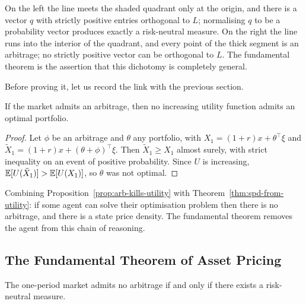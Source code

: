 \documentclass[a4paper]{scrartcl}
\begin{document}
On the left the line meets the shaded quadrant only at the origin, and there is a vector $q$ with strictly positive entries orthogonal to $L$; normalising $q$ to be a probability vector produces exactly a risk-neutral measure. On the right the line runs into the interior of the quadrant, and every point of the thick segment is an arbitrage; no strictly positive vector can be orthogonal to $L$. The fundamental theorem is the assertion that this dichotomy is completely general.

Before proving it, let us record the link with the previous section.

\begin{proposition}\label{prop:arb-kills-utility}
	If the market admits an arbitrage, then no increasing utility function admits an optimal portfolio.
\end{proposition}

\begin{proof}
	Let $\phi$ be an arbitrage and $\theta$ any portfolio, with $X_1 = (1+r)x + \theta^\top\xi$ and $\tilde X_1 = (1+r)x + (\theta+\phi)^\top \xi$. Then $\tilde X_1 \geq X_1$ almost surely, with strict inequality on an event of positive probability. Since $U$ is increasing, $\mathbb{E}[U(\tilde X_1)] > \mathbb{E}[U(X_1)]$, so $\theta$ was not optimal.
\end{proof}

Combining Proposition~\ref{prop:arb-kills-utility} with Theorem~\ref{thm:spd-from-utility}: if some agent can solve their optimisation problem then there is no arbitrage, and there is a state price density. The fundamental theorem removes the agent from this chain of reasoning.

\subsection{The Fundamental Theorem of Asset Pricing}

\begin{theorem}\label{thm:ftap1}
	The one-period market admits no arbitrage if and only if there exists a risk-neutral measure.
\end{theorem}
\end{document}
